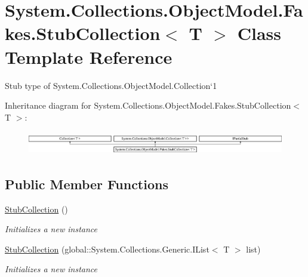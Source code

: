 \hypertarget{class_system_1_1_collections_1_1_object_model_1_1_fakes_1_1_stub_collection_3_01_t_01_4}{\section{System.\-Collections.\-Object\-Model.\-Fakes.\-Stub\-Collection$<$ T $>$ Class Template Reference}
\label{class_system_1_1_collections_1_1_object_model_1_1_fakes_1_1_stub_collection_3_01_t_01_4}
}


Stub type of System.\-Collections.\-Object\-Model.\-Collection`1 


Inheritance diagram for System.\-Collections.\-Object\-Model.\-Fakes.\-Stub\-Collection$<$ T $>$\-:\begin{figure}[H]
\begin{center}
\leavevmode
\includegraphics[height=1.048689cm]{class_system_1_1_collections_1_1_object_model_1_1_fakes_1_1_stub_collection_3_01_t_01_4}
\end{center}
\end{figure}
\subsection*{Public Member Functions}
\begin{DoxyCompactItemize}
\item 
\hyperlink{class_system_1_1_collections_1_1_object_model_1_1_fakes_1_1_stub_collection_3_01_t_01_4_a6b2eee06f3aca4299f14b9edcb3ffb17}{Stub\-Collection} ()
\begin{DoxyCompactList}\small\item\em Initializes a new instance\end{DoxyCompactList}\item 
\hyperlink{class_system_1_1_collections_1_1_object_model_1_1_fakes_1_1_stub_collection_3_01_t_01_4_a449ed6751383e93075e0f2e8caab67f8}{Stub\-Collection} (global\-::\-System.\-Collections.\-Generic.\-I\-List$<$ T $>$ list)
\begin{DoxyCompactList}\small\item\em Initializes a new instance\end{DoxyCompactList}\end{DoxyCompactItemize}
